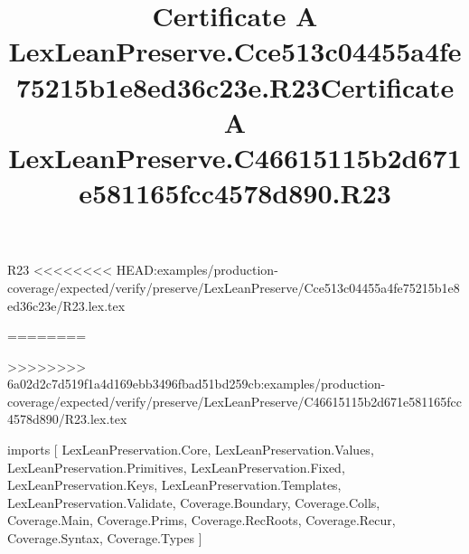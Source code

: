 \begin{lexlean}{R23}
<<<<<<<< HEAD:examples/production-coverage/expected/verify/preserve/LexLeanPreserve/Cce513c04455a4fe75215b1e8ed36c23e/R23.lex.tex
\title{Certificate A LexLeanPreserve.Cce513c04455a4fe75215b1e8ed36c23e.R23}
========
\title{Certificate A LexLeanPreserve.C46615115b2d671e581165fcc4578d890.R23}
>>>>>>>> 6a02d2c7d519f1a4d169ebb3496fbad51bd259cb:examples/production-coverage/expected/verify/preserve/LexLeanPreserve/C46615115b2d671e581165fcc4578d890/R23.lex.tex
\begin{coremodule}
imports [
  LexLeanPreservation.Core,
  LexLeanPreservation.Values,
  LexLeanPreservation.Primitives,
  LexLeanPreservation.Fixed,
  LexLeanPreservation.Keys,
  LexLeanPreservation.Templates,
  LexLeanPreservation.Validate,
  Coverage.Boundary,
  Coverage.Colls,
  Coverage.Main,
  Coverage.Prims,
  Coverage.RecRoots,
  Coverage.Recur,
  Coverage.Syntax,
  Coverage.Types
]


\end{coremodule}
\end{lexlean}
